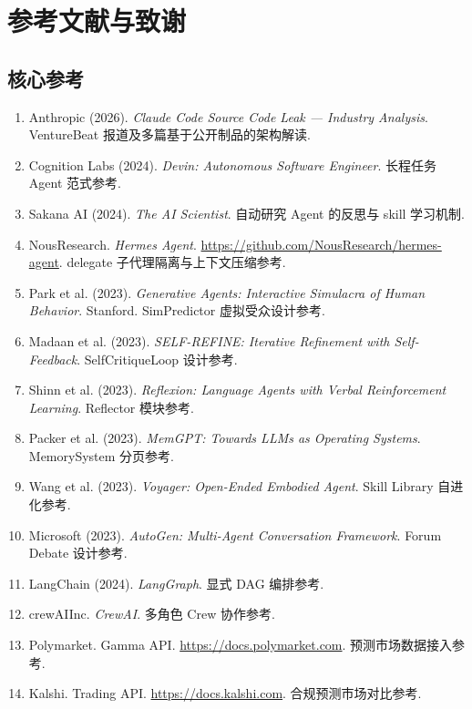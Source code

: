 \section{参考文献与致谢}\label{sec:references}

\subsection{核心参考}

\begin{enumerate}
    \item Anthropic (2026). \textit{Claude Code Source Code Leak — Industry Analysis}. VentureBeat 报道及多篇基于公开制品的架构解读.
    \item Cognition Labs (2024). \textit{Devin: Autonomous Software Engineer}. 长程任务 Agent 范式参考.
    \item Sakana AI (2024). \textit{The AI Scientist}. 自动研究 Agent 的反思与 skill 学习机制.
    \item NousResearch. \textit{Hermes Agent}. \url{https://github.com/NousResearch/hermes-agent}. delegate 子代理隔离与上下文压缩参考.
    \item Park et al. (2023). \textit{Generative Agents: Interactive Simulacra of Human Behavior}. Stanford. SimPredictor 虚拟受众设计参考.
    \item Madaan et al. (2023). \textit{SELF-REFINE: Iterative Refinement with Self-Feedback}. SelfCritiqueLoop 设计参考.
    \item Shinn et al. (2023). \textit{Reflexion: Language Agents with Verbal Reinforcement Learning}. Reflector 模块参考.
    \item Packer et al. (2023). \textit{MemGPT: Towards LLMs as Operating Systems}. MemorySystem 分页参考.
    \item Wang et al. (2023). \textit{Voyager: Open-Ended Embodied Agent}. Skill Library 自进化参考.
    \item Microsoft (2023). \textit{AutoGen: Multi-Agent Conversation Framework}. Forum Debate 设计参考.
    \item LangChain (2024). \textit{LangGraph}. 显式 DAG 编排参考.
    \item crewAIInc. \textit{CrewAI}. 多角色 Crew 协作参考.
    \item Polymarket. Gamma API. \url{https://docs.polymarket.com}. 预测市场数据接入参考.
    \item Kalshi. Trading API. \url{https://docs.kalshi.com}. 合规预测市场对比参考.
\end{enumerate}

